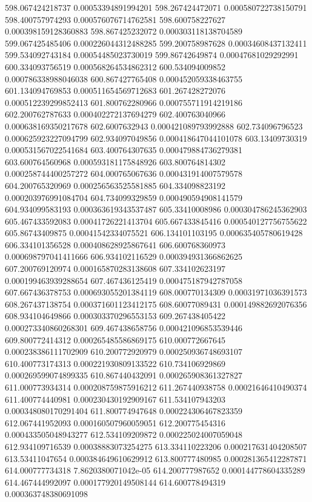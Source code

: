 {598.067424218737 0.00053394891994201
598.267424472071 0.000580722738150791
598.400757974293 0.000576076714762581
598.600758227627 0.000398159128360883
598.867425232072 0.000303118138704589
599.067425485406 0.000226044312488285
599.200758987628 0.00034608437132411
599.534092743184 0.00054485023730019
599.86742649874 0.00047681029292991
600.334093756519 0.000568264534862312
600.534094009852 0.000786338988046038
600.867427765408 0.000452059338463755
601.134094769853 0.000511654569712683
601.267428272076 0.000512239299852413
601.800762280966 0.000755711914219186
602.200762787633 0.000402272137694279
602.400763040966 0.000638169350217678
602.6007632943 0.000421089793992888
602.734096796523 0.000625923227094799
602.934097049856 0.000418647044101078
603.13409730319 0.000531567022541684
603.400764307635 0.000479884736279381
603.600764560968 0.000593181175848926
603.800764814302 0.000258744400257272
604.000765067636 0.000431914007579578
604.200765320969 0.000256563525581885
604.334098823192 0.000203976991084704
604.734099329859 0.000490594908141579
604.934099583193 0.000363619343537487
605.33410008986 0.000304786245362903
605.467433592083 0.00041726221413704
605.667433845416 0.000540127756755622
605.86743409875 0.00041542334075521
606.134101103195 0.000635405780619428
606.334101356528 0.000408628925867641
606.600768360973 0.000698797041411666
606.934102116529 0.000394931366862625
607.200769120974 0.000165870283138608
607.334102623197 0.000199463939288654
607.467436125419 0.000475187942787058
607.667436378753 0.000693055201384119
608.000770134309 0.00031971036391573
608.267437138754 0.000371601123412175
608.60077089431 0.000149882692076356
608.934104649866 0.000303370296553153
609.267438405422 0.000273340860268301
609.467438658756 0.000421096853539446
609.800772414312 0.000265485586869175
610.000772667645 0.000238386111702909
610.200772920979 0.000250936748693107
610.400773174313 0.000221930809133522
610.734106929869 0.000269599074899335
610.867440432091 0.000265908361327827
611.000773934314 0.000208759875916212
611.267440938758 0.00021646410490374
611.400774440981 0.000230430192909167
611.534107943203 0.000348080170291404
611.800774947648 0.000224306467823359
612.067441952093 0.000160507960059051
612.200775454316 0.000433505048943277
612.534109209872 0.000225024007059048
612.934109716539 0.00038883073254275
613.334110223206 0.000217631404208507
613.53411047654 0.000384649610629912
613.800777480985 0.000281365412287871
614.000777734318 7.8620380071042e-05
614.200777987652 0.000144778604335289
614.467444992097 0.000177920149508144
614.600778494319 0.000363748380691098
}
